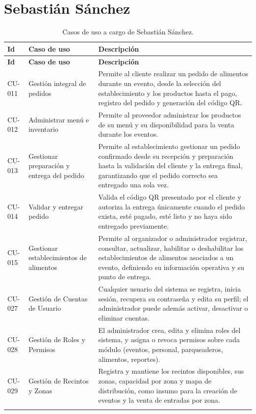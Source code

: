 \documentclass[11pt,a4paper]{article}
\begin{document}
\newpage

\section{Sebastián Sánchez}

\begin{longtable}{P{1.6cm}P{4cm}P{9.4cm}}
\toprule
\textbf{Id} & \textbf{Caso de uso} & \textbf{Descripción}\\
\midrule
\endfirsthead
\toprule
\textbf{Id} & \textbf{Caso de uso} & \textbf{Descripción}\\
\midrule
\endhead

CU-011 & Gestión integral de pedidos &
Permite al cliente realizar un pedido de alimentos durante un evento, desde la selección del
establecimiento y los productos hasta el pago, registro del pedido y generación del código
QR.\\[0.5em]

CU-012 & Administrar menú e inventario &
Permite al proveedor administrar los productos de su menú y su disponibilidad para la venta
durante los eventos.\\[0.5em]

CU-013 & Gestionar preparación y entrega del pedido &
Permite al establecimiento gestionar un pedido confirmado desde su recepción y preparación hasta
la validación del cliente y la entrega final, garantizando que el pedido correcto sea entregado
una sola vez.\\[0.5em]

CU-014 & Validar y entregar pedido &
Valida el código QR presentado por el cliente y autoriza la entrega únicamente cuando el pedido
exista, esté pagado, esté listo y no haya sido entregado previamente.\\[0.5em]

CU-015 & Gestionar establecimientos de alimentos &
Permite al organizador o administrador registrar, consultar, actualizar, habilitar o deshabilitar
los establecimientos de alimentos asociados a un evento, definiendo su información operativa y
su punto de entrega.\\[0.5em]

CU-027 & Gestión de Cuentas de Usuario &
Cualquier usuario del sistema se registra, inicia sesión, recupera su contraseña y edita su
perfil; el administrador puede además activar, desactivar o eliminar cuentas.\\[0.5em]

CU-028 & Gestión de Roles y Permisos &
El administrador crea, edita y elimina roles del sistema, y asigna o revoca permisos sobre cada
módulo (eventos, personal, parqueaderos, alimentos, reportes).\\[0.5em]

CU-029 & Gestión de Recintos y Zonas &
Registra y mantiene los recintos disponibles, sus zonas, capacidad por zona y mapa de
distribución, como insumo para la creación de eventos y la venta de entradas por zona.\\
\bottomrule
\caption{Casos de uso a cargo de Sebastián Sánchez.}
\end{longtable}
\end{document}
